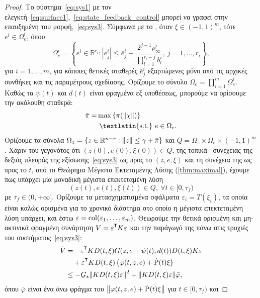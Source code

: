 \begin{proof}
Το σύστημα~\eqref{eq:sys1} με τον ελεγκτή~\eqref{eq:surface1},~\eqref{eq:state_feedback_control} μπορεί να γραφεί στην επαυξημένη του μορφή,~\eqref{eq:sys3}. Σύμφωνα με το , όταν $\xi \in (-1,1)^m$, τότε $e^i \in \Omega_e^i$, όπου
\[
    \Omega_e^i = \left\{e^i \in \mathbb R^{r_i} : 
    |e_j^i| \leq \bar e_j^i 
    + \frac{2^{j-1} \rho_\infty^i}
    {\prod_{l=1}^{r_i - j} b^i_l},\
    j = 1, \ldots, r_i \right\},
\]
για $i = 1, \ldots, m$, για κάποιες θετικές σταθερές $\bar e_j^i$ εξαρτώμενες μόνο από τις αρχικές συνθήκες και τις παραμέτρους σχεδίασης. Ορίζουμε το σύνολο $\Omega_e = \prod_{i=1}^m \Omega_e^i$. Καθώς τα $\psi(t)$ και $d(t)$ είναι φραγμένα εξ υποθέσεως, μπορούμε να ορίσουμε την ακόλουθη σταθερά:
\begin{align*}
    \bar \pi = &\max\qty{\pi \pqty{\norm{\chi}}}\\
    & \text{ \textlatin{s.t.} } e \in \Omega_e.
\end{align*}
Ορίζουμε τα σύνολα $\Omega_z = \qty{z \in \mathbb{R}^{n-r} : \norm{z} \leq \gamma + \bar \pi}$ και $Q = \Omega_z \times \Omega_e \times {(-1,1)}^m$. Χάριν του γεγονότος ότι $(z(0), e(0), \xi(0)) \in Q$, της τοπικά \lip\ συνέχειας της δεξιάς πλευράς της εξίσωσης~\eqref{eq:sys3} ως προς το $(z,e,\xi)$ και τη συνέχεια της ως προς το $t$, από το Θεώρημα Μέγιστα Εκτεταμένης Λύσης (\cref{thm:maximal}), έχουμε πως υπάρχει μία μοναδική μέγιστα επεκτεταμένη λύση
\[
    (z(t), e(t), \xi(t)) \in Q,\ \forall t \in [0, \tau_f)
\]
με $\tau_f \in (0, +\infty]$. Ορίζουμε τα μετασχηματισμένα σφάλματα $\varepsilon_i = T(\xi_i)$, τα οποία είναι καλώς ορισμένα για το χρονικό διάστημα στο οποίο η μέγιστα επεκτεταμένη λύση υπάρχει, και έστω $\varepsilon = \operatorname{col}(\varepsilon_1, \ldots, \varepsilon_m)$. Θεωρούμε την θετικά ορισμένη και μη-ακτινικά φραγμένη συνάρτηση $V = \varepsilon^\T K \varepsilon$ και την παράγωγό της πάνω στις τροχιές του συστήματος~\eqref{eq:sys3}:
\begin{align*}
    \dot V &= -\varepsilon^\T K D(t, \xi) 
        G(z, e + \psi(t), d(t))  D(t,\xi) 
        K \varepsilon \\
    & \quad + \varepsilon^\T K D(t,\xi)\left(
        \varphi(t,z,e) + \dot \Rho(t) \xi\right)\\
    &\leq - \ubar G_s \norm{K D(t, \xi) \varepsilon}^2
        + \norm{K D(t, \xi) \varepsilon} \bar \varphi,
\end{align*}
όπου $\bar \varphi$ είναι ένα άνω φράγμα του $\norm{\varphi(t,z,e) + \dot {\mathrm{P}}(t) \xi}$ για $t \in [0,\tau_f)$ και

\end{proof}
